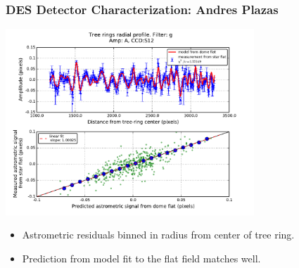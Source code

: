\documentclass{beamer}
\begin{document}
\frame
{
    \frametitle{DES Detector Characterization: Andres Plazas}

    \begin{center}
    \includegraphics[width=0.7\textwidth]{astrometric_residuals_vs_model_S12.pdf}
\end{center}

    {\small 
        \begin{itemize}
            \item Astrometric residuals binned in radius from center of tree ring.
            \item Prediction from model fit to the flat field matches well.
        \end{itemize}
    }
}
\end{document}

